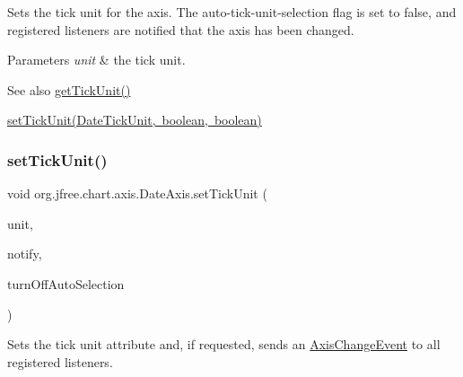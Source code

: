 Sets the tick unit for the axis. The auto-\/tick-\/unit-\/selection flag is set to {\ttfamily false}, and registered listeners are notified that the axis has been changed.


\begin{DoxyParams}{Parameters}
{\em unit} & the tick unit.\\
\hline
\end{DoxyParams}
\begin{DoxySeeAlso}{See also}
\mbox{\hyperlink{classorg_1_1jfree_1_1chart_1_1axis_1_1_date_axis_a8cc10a62c85228fd1431a9d15c7dabe8}{get\+Tick\+Unit()}} 

\mbox{\hyperlink{classorg_1_1jfree_1_1chart_1_1axis_1_1_date_axis_afaf416d81d2754d710734ebb2ed4c036}{set\+Tick\+Unit(\+Date\+Tick\+Unit, boolean, boolean)}} 
\end{DoxySeeAlso}
\mbox{\label{classorg_1_1jfree_1_1chart_1_1axis_1_1_date_axis_afaf416d81d2754d710734ebb2ed4c036}} 
\subsubsection{\texorpdfstring{set\+Tick\+Unit()}{setTickUnit()}\hspace{0.1cm}{\footnotesize\ttfamily [2/2]}}
{\footnotesize\ttfamily void org.\+jfree.\+chart.\+axis.\+Date\+Axis.\+set\+Tick\+Unit (\begin{DoxyParamCaption}\item[{\mbox{\hyperlink{classorg_1_1jfree_1_1chart_1_1axis_1_1_date_tick_unit}{Date\+Tick\+Unit}}}]{unit,  }\item[{boolean}]{notify,  }\item[{boolean}]{turn\+Off\+Auto\+Selection }\end{DoxyParamCaption})}

Sets the tick unit attribute and, if requested, sends an \mbox{\hyperlink{}{Axis\+Change\+Event}} to all registered listeners.


